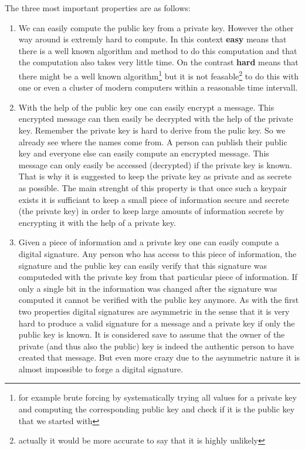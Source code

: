 \documentclass[ebook,12pt,oneside,openany]{memoir}
\begin{document}
The three most important properties are as follows:
\begin{enumerate}
\item We can easily compute the public key from a private key.
However the other way around is extremly hard to compute.
In this context \textbf{easy} means that there is a well known algorithm and method to do this computation and that the computation also takes very little time.
On the contrast \textbf{hard} means that there might be a well known algorithm\footnote{for example brute forcing by systematically trying all values for a private key and computing the corresponding public key and check if it is the public key that we started with} but it is not feasable\footnote{actually it would be more accurate to say that it is highly  unlikely} to do this with one or even a cluster of modern computers within a reasonable time intervall. 
\item With the help of the public key one can easily encrypt a message.
This encrypted message can then easily be decrypted with the help of the private key.
Remember the private key is hard to derive from the pulic key.
So we already see where the names come from.
A person can publish their public key and everyone else can easily compute an encrypted message.
This message can only easily be accessed (decrypted) if the private key is known.
That is why it is suggested to keep the private key as private and as  secrete as possible.
The main strenght of this property is that once such a keypair exists it is sufficiant to keep a small piece of information secure and secrete (the private key) in order to keep large amounts of information secrete by encrypting it with the help of a private key.
\item Given a piece of information and a private key one can easily compute a digital signature.
  Any person who has access to this piece of information, the signature and the public key can easily verify that this signature was computeded with the private key from that particular piece of information.
  If only a single bit in the information was changed after the signature was computed it cannot be verified with the public key anymore.
  As with the first two properties digital signatures are asymmetric in the sense that it is very hard to produce a valid signature for a message and a private key if only the public key is known.
  It is considered save to assume that the owner of the private (and thus also the public) key is indeed the authentic person to have created that message.
  But even more crazy due to the asymmetric nature it is almost impossible to forge a digital signature.
\end{enumerate}
\end{document}
